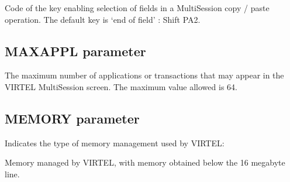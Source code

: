 \documentclass[letterpaper,10pt,english]{sphinxmanual}
\begin{document}
\sphinxAtStartPar
{} \sphinxhyphen{} Code of the key enabling selection of fields in a Multi\sphinxhyphen{}Session copy / paste operation. The default key is ‘end of field’ : Shift PA2.

\ignorespaces 

\subsection{MAXAPPL parameter}
\label{\detokenize{Installation_Guide:maxappl-parameter}}\label{\detokenize{Installation_Guide:index-90}}
\begin{sphinxVerbatim}[commandchars=\\\{\}]
                            
\end{sphinxVerbatim}

\sphinxAtStartPar
{} \sphinxhyphen{} The maximum number of applications or transactions that may appear in the VIRTEL Multi\sphinxhyphen{}Session screen. The maximum value allowed is 64.

\ignorespaces 

\subsection{MEMORY parameter}
\label{\detokenize{Installation_Guide:memory-parameter}}\label{\detokenize{Installation_Guide:index-91}}
\begin{sphinxVerbatim}[commandchars=\\\{\}]
\PYG{p}{[}\PYG{p}{]} 
\end{sphinxVerbatim}

\sphinxAtStartPar
Indicates the type of memory management used by VIRTEL:

\sphinxAtStartPar
{} \sphinxhyphen{} Memory managed by VIRTEL, with memory obtained below the 16 megabyte line.
\end{document}
